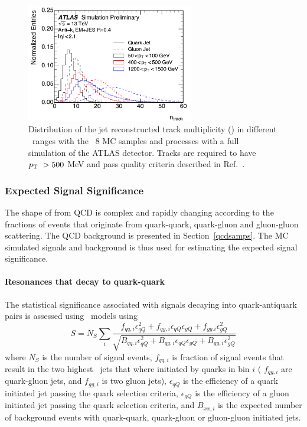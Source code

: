 \begin{figure}[htb]
 \centering
\includegraphics[width=0.65\textwidth]{fig/tagging/fig_01_ATL-PHYS-PUB-2017-009.pdf}
\caption{Distribution of the jet reconstructed track multiplicity (\ntrk ) in
 different \pt\ ranges with the \pythia~8 MC samples and processes with a full simulation of the
 ATLAS detector. Tracks are required to have $p_{\mathrm{T}}~> 500$ MeV and pass
  quality criteria described in Ref.~\cite{ATL-PHYS-PUB-2017-009}. }
\end{figure}


\subsubsection{Expected Signal Significance}

The shape of \mjj from QCD is complex and rapidly changing according to the fractions of events that originate from quark-quark, quark-gluon and gluon-gluon scattering. The QCD background is presented in Section~\ref{qcdsamps}. The MC simulated signals and background is thus used for estimating the expected signal significance.


\paragraph{Resonances that decay to quark-quark\\}

The statistical significance associated with signals decaying into quark-antiquark pairs is assessed using \Zprime\ models using 
\begin{equation}
	S = N_S \sum_i{ \dfrac{ f_{qq,i}\epsilon_{qQ}^2 + f_{qg,i}\epsilon_{qQ}\epsilon_{gQ} + f_{gg.i}\epsilon_{gQ}^2  } {\sqrt{ B_{qq,i}\epsilon_{qQ}^2 + B_{qg,i}\epsilon_{qQ}\epsilon_{gQ} + B_{gg,i}\epsilon_{gQ}^2  }}}
\end{equation}
where $N_S$ is the number of signal events, $f_{qq,i}$ is fraction of signal events that result in the two 
highest \pT\ jets that where initiated by quarks in bin $i$ ( $f_{qg,i}$ are quark-gluon jets, and $f_{gg,i}$ is two gluon jets), 
$\epsilon_{qQ}$ is the efficiency of a quark initiated jet passing the quark selection criteria, 
$\epsilon_{gQ}$ is the efficiency of a gluon initiated jet passing the quark selection criteria, 
and $B_{xx,i}$ is the expected number of background events with quark-quark, quark-gluon or gluon-gluon initiated jets. 


